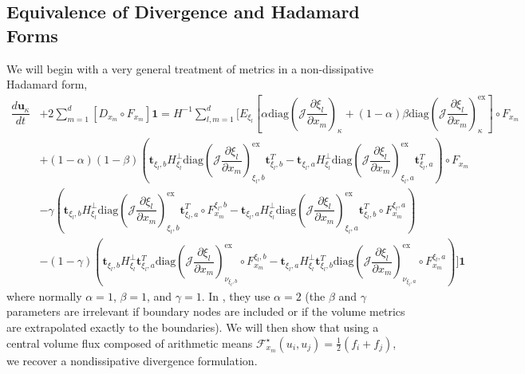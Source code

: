 \documentclass[12pt,a4paper]{article}
\newcommand{\pder}[2][]{\dfrac{\partial #1}{\partial #2}} %
\newcommand{\der}[2][]{\dfrac{d #1}{d #2}} %
\newcommand{\fn}[1]{\mathcal{#1}} %
\begin{document}
\subsection{Equivalence of Divergence and Hadamard Forms}

We will begin with a very general treatment of metrics in a non-dissipative Hadamard form,
\begin{align*}
\der[\bm{u}_\kappa]{t} &+ 2 \sum_{m=1}^d \left[ D_{x_m} \circ F_{x_m} \right] \bm{1}  
= H^{-1} \sum_{l,m=1}^d \Bigg[  E_{\xi_l} \left[ \alpha \text{diag}  \left( \fn{J} \pder[\xi_l]{x_m} \right)_{\kappa} + (1-\alpha) \beta \text{diag}  \left( \fn{J} \pder[\xi_l]{x_m} \right)_{\kappa}^\text{ex} \right] \circ  F_{x_m} \\
& + (1-\alpha) (1 - \beta)  \left(  \bm{t}_{\xi_l, b} H^{\bot}_{\xi_l}  \text{diag} \left( \fn{J} \pder[\xi_l]{x_m} \right)_{\xi_l, b}^\text{ex} \bm{t}_{\xi_l, b}^T -  \bm{t}_{\xi_l, a} H^{\bot}_{\xi_l}  \text{diag} \left( \fn{J} \pder[\xi_l]{x_m} \right)_{\xi_l , a}^\text{ex} \bm{t}_{\xi_l, a}^T \right)  \circ  F_{x_m} \\
& - \gamma \left( \bm{t}_{\xi_l, b} H^{\bot}_{\xi_l}  \text{diag} \left( \fn{J} \pder[\xi_l]{x_m} \right)_{\xi_l,b}^\text{ex} \bm{t}_{\xi_l, a}^T \circ F_{x_m}^{\xi_l , b} - \bm{t}_{\xi_l, a} H^{\bot}_{\xi_l} \text{diag} \left( \fn{J} \pder[\xi_l]{x_m} \right)_{\xi_l,a}^\text{ex} \bm{t}_{\xi_l, b}^T \circ F_{x_m}^{\xi_l , a} \right) \\
& - (1-\gamma) \left(  \bm{t}_{\xi_l, b} H^{\bot}_{\xi_l} \bm{t}_{\xi_l, a}^T \text{diag} \left( \fn{J} \pder[\xi_l]{x_m} \right)_{\nu_{\xi_l,b}}^\text{ex} \circ F_{x_m}^{\xi_l , b} -  \bm{t}_{\xi_l, a} H^{\bot}_{\xi_l} \bm{t}_{\xi_l, b}^T \text{diag} \left( \fn{J} \pder[\xi_l]{x_m} \right)_{\nu_{\xi_l,a}}^\text{ex} \circ F_{x_m}^{\xi_l , a} \right) \Bigg] \bm{1}
\end{align*}
where normally $\alpha = 1$, $\beta = 1$, and $\gamma=1$. In \cite{nolasco_optimized_2020}, they use $\alpha = 2$ (the $\beta$ and $\gamma$ parameters are irrelevant if boundary nodes are included or if the volume metrics are extrapolated exactly to the boundaries). We will then show that using a central volume flux composed of arithmetic means $ \fn{F}^\star_{x_m} (u_i, u_j) = \frac{1}{2}(f_i + f_j) $, we recover a nondissipative divergence formulation.
\end{document}
